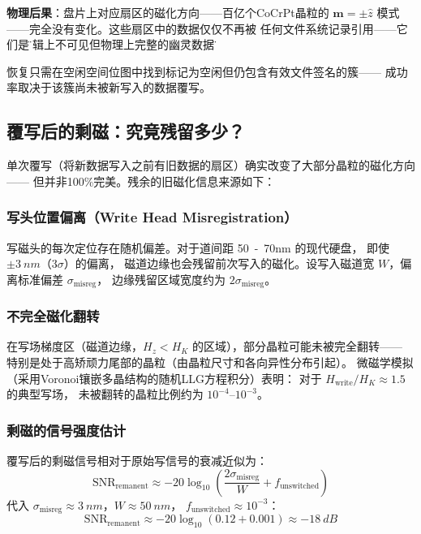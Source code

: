\documentclass[11pt,a4paper,twoside]{article}
\theoremstyle{definition}\newtheorem{definition}{定义}[section]
\theoremstyle{plain}\newtheorem{theorem}{定理}[section]
\theoremstyle{remark}\newtheorem{remark}{注解}[section]
\begin{document}
\textbf{物理后果}：盘片上对应扇区的磁化方向——百亿个CoCrPt晶粒的
$\mathbf{m} = \pm \hat{z}$ 模式——完全没有变化。这些扇区中的数据仅仅不再被
任何文件系统记录引用——它们是\"逻辑上不可见但物理上完整的幽灵数据\"。

恢复只需在空闲空间位图中找到标记为空闲但仍包含有效文件签名的簇——
成功率取决于该簇尚未被新写入的数据覆写。

\subsection{覆写后的剩磁：究竟残留多少？}

单次覆写（将新数据写入之前有旧数据的扇区）确实改变了大部分晶粒的磁化方向——
但并非100\%完美。残余的旧磁化信息来源如下：

\subsubsection{写头位置偏离（Write Head Misregistration）}

写磁头的每次定位存在随机偏差。对于道间距 \SI{50}{-70}{nm} 的现代硬盘，
即使 $\pm \SI{3}{nm}$（$3\sigma$）的偏离，
磁道边缘也会残留前次写入的磁化。设写入磁道宽 $W$，偏离标准偏差 $\sigma_{\text{misreg}}$，
边缘残留区域宽度约为 $2\sigma_{\text{misreg}}$。

\subsubsection{不完全磁化翻转}

在写场梯度区（磁道边缘，$H_z < H_K$ 的区域），部分晶粒可能未被完全翻转——
特别是处于高矫顽力尾部的晶粒（由晶粒尺寸和各向异性分布引起）。
微磁学模拟（采用Voronoi镶嵌多晶结构的随机LLG方程积分）表明：
对于 $H_{\text{write}} / H_K \approx 1.5$ 的典型写场，
未被翻转的晶粒比例约为 $10^{-4}$--$10^{-3}$。

\subsubsection{剩磁的信号强度估计}

覆写后的剩磁信号相对于原始写信号的衰减近似为：
\begin{equation}\label{eq:remanence-snr}
  \text{SNR}_{\text{remanent}} \approx -20 \log_{10}\!\left(
    \frac{2\sigma_{\text{misreg}}}{W}
    + f_{\text{unswitched}}
  \right)
\end{equation}
代入 $\sigma_{\text{misreg}} \approx \SI{3}{nm}$，$W \approx \SI{50}{nm}$，
$f_{\text{unswitched}} \approx 10^{-3}$：
\[
\text{SNR}_{\text{remanent}} \approx -20 \log_{10}(0.12 + 0.001) \approx \SI{-18}{dB}
\]
\end{document}
